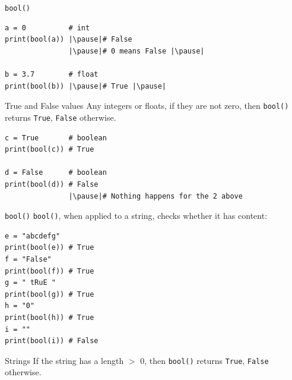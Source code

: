 \documentclass[dvipsnames, svgnames, x11names]{beamer}
\begin{document}
\begin{frame}[fragile]{\texttt{bool()}}
\begin{verbatim} 
a = 0          # int
print(bool(a)) |\pause|# False
               |\pause|# 0 means False |\pause|

b = 3.7        # float
print(bool(b)) |\pause|# True |\pause|
\end{verbatim}

\begin{block}{True and False values}
	Any integers or floats, if they are not zero, then \texttt{bool()} returns \texttt{True}, \texttt{False} otherwise.
\end{block}

\pause

\begin{verbatim} 
c = True       # boolean
print(bool(c)) # True

d = False      # boolean
print(bool(d)) # False
               |\pause|# Nothing happens for the 2 above
\end{verbatim}
\end{frame}

\begin{frame}[fragile]{\texttt{bool()}}
\texttt{bool()}, when applied to a string, checks whether it has content: \pause
\begin{verbatim} 
e = "abcdefg"  
print(bool(e)) # True
f = "False"    
print(bool(f)) # True
g = " tRuE "   
print(bool(g)) # True
h = "0"        
print(bool(h)) # True
i = ""         
print(bool(i)) # False
\end{verbatim}

\begin{block}{Strings}
If the string has a length $>$ 0, then \texttt{bool()} returns \texttt{True}, \texttt{False} otherwise.
\end{block}

\end{frame}
\end{document}
